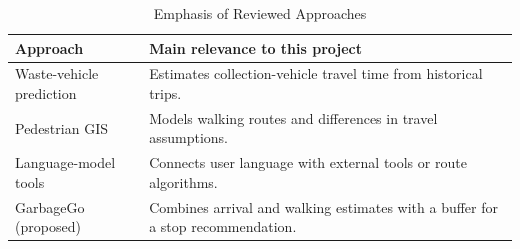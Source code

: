 \begin{table}[htbp]
\caption{Emphasis of Reviewed Approaches}
\label{tab:comparison}
\centering\footnotesize
\begin{tabular}{@{}p{}p{}@{}}
\toprule Approach & Main relevance to this project \\
\midrule
Waste-vehicle prediction \cite{chen2019travel} & Estimates collection-vehicle travel time from historical trips. \\
Pedestrian GIS \cite{alshammas2023gis,fink2024travel} & Models walking routes and differences in travel assumptions. \\
Language-model tools \cite{yao2023react,yuan2025llmap} & Connects user language with external tools or route algorithms. \\
GarbageGo (proposed) & Combines arrival and walking estimates with a buffer for a stop recommendation. \\
\bottomrule
\end{tabular}
\end{table}
